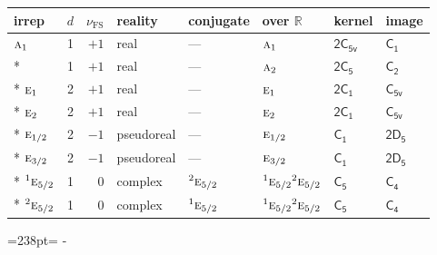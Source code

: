 \documentclass[10pt,a4paper]{article}
\makeatletter
\def\grouprule#1#2{\noalign{\marks\LTgroupmarks{\the\belowrulesep}\nobreak\vskip#1%
  \vskip\aboverulesep}\multispan\LT@cols\unskip{\leaders\hrule\@height#2\hfill\kern\z@}\cr
  \noalign{\penalty\LTrulebreak\vskip\belowrulesep\global\@lastruleclass\z@}}
\newcommand{\needspace}[1]{\par\penalty-100\begingroup\dimen0=#1\relax\dimen2=\pagegoal
  \advance\dimen2-\pagetotal\ifdim\dimen0>\dimen2\relax\ifdim\dimen2>0pt\vfil\break\fi\fi
  \endgroup}
\numberwithin{equation}{section}
\newcommand{\grp}[1]{\mathsf{#1}}
\newcommand{\irr}[1]{\text{\normalfont\scshape #1}}
\newcommand{\conjpair}[1]{{}^{#1}}
\newcommand{\detbox}[1]{{\setlength{\fboxsep}{1pt}\fbox{#1}}}
\newcommand{\fsind}{\nu_{\mathrm{FS}}}
\makeatother
\begin{document}
\setlength{\emergencystretch}{2em}\par\setlength{\emergencystretch}{0pt}
{\small\renewcommand{\arraystretch}{1.25}\setlength{\tabcolsep}{4pt}\begin{longtable}{@{}lrrlllll@{}}\toprule
irrep & $d$ & $\fsind$ & reality & conjugate & over $\mathbb{R}$ & kernel & image\\\midrule\endhead
\bottomrule\endfoot\endlastfoot
$\irr{a}_{1}$ & 1 & $+1$ & real & --- & $\irr{a}_{1}$ & \href{2C5v.pdf}{$\grp{2C_{5v}}$} & \href{../../../rotation/data/pdf/C1.pdf}{$\grp{C_{1}}$}\\*
\detbox{$\irr{a}_{2}$} & 1 & $+1$ & real & --- & $\irr{a}_{2}$ & \href{2C5.pdf}{$\grp{2C_{5}}$} & \href{../../../rotation/data/pdf/C2.pdf}{$\grp{C_{2}}$}\\*
$\irr{e}_{1}$ & 2 & $+1$ & real & --- & $\irr{e}_{1}$ & \href{2C1.pdf}{$\grp{2C_{1}}$} & \href{../../../rotation/data/pdf/C5v.pdf}{$\grp{C_{5v}}$}\\*
$\irr{e}_{2}$ & 2 & $+1$ & real & --- & $\irr{e}_{2}$ & \href{2C1.pdf}{$\grp{2C_{1}}$} & \href{../../../rotation/data/pdf/C5v.pdf}{$\grp{C_{5v}}$}\\*
\grouprule{0pt}{\lightrulewidth}
$\irr{e}_{1/2}$ & 2 & $-1$ & pseudoreal & --- & $\irr{e}_{1/2}$ & \href{C1.pdf}{$\grp{C_{1}}$} & \href{2D5.pdf}{$\grp{2D_{5}}$}\\*
$\irr{e}_{3/2}$ & 2 & $-1$ & pseudoreal & --- & $\irr{e}_{3/2}$ & \href{C1.pdf}{$\grp{C_{1}}$} & \href{2D5.pdf}{$\grp{2D_{5}}$}\\*
$\conjpair{1}\irr{e}_{5/2}$ & 1 & $0$ & complex & $\conjpair{2}\irr{e}_{5/2}$ & $\conjpair{1}\irr{e}_{5/2}\conjpair{2}\irr{e}_{5/2}$ & \href{C5.pdf}{$\grp{C_{5}}$} & \href{../../../rotation/data/pdf/C4.pdf}{$\grp{C_{4}}$}\\*
$\conjpair{2}\irr{e}_{5/2}$ & 1 & $0$ & complex & $\conjpair{1}\irr{e}_{5/2}$ & $\conjpair{1}\irr{e}_{5/2}\conjpair{2}\irr{e}_{5/2}$ & \href{C5.pdf}{$\grp{C_{5}}$} & \href{../../../rotation/data/pdf/C4.pdf}{$\grp{C_{4}}$}\\
\bottomrule\end{longtable}}
\needspace{238pt}
\end{document}
